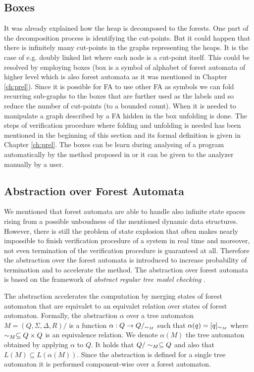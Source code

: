 \subsection{Boxes}
\label{subsec:boxes}

It was already explained how the heap is decomposed to the forests.
One part of the decomposition process is identifying the cut-points.
But it could happen that there is infinitely many cut-points in the graphs representing the heaps.
It is the case of e.g. doubly linked list where each node is a cut-point itself.
This could be resolved by employing boxes (box is a symbol of alphabet of forest automata of higher level which is also forest automata as it was mentioned in Chapter \ref{ch:prel}).
Since it is possible for FA to use other FA as symbols we can fold recurring sub-graphs to the boxes that are further used as the labels
and so reduce the number of cut-points (to a bounded count).
When it is needed to manipulate a graph described by a FA hidden in the box unfolding is done.
The steps of verification procedure where folding and unfolding is needed has been mentioned in the beginning of this section
and its formal definition is given in Chapter \ref{ch:prel}.
The boxes can be learn during analysing of a program automatically by the method proposed in \cite{forester13} or
it can be given to the analyzer manually by a user.

\subsection{Abstraction over Forest Automata}
\label{subsec:abstraction}

We mentioned that forest automata are able to handle also infinite state spaces
rising from a possible unboudness of the mentioned dynamic data structures.
However, there is still the problem of state explosion that often makes
nearly impossible to finish verification procedure of a system in real time
and moreover, not even termination of the verification procedure is guaranteed at all.
Therefore the abstraction over the forest automata is introduced to increase probability of termination
and to accelerate the method.
The abstraction over forest automata is based on the framework of \emph{abstract regular tree model checking} \cite{artmc}.

The abstraction accelerates the computation by merging states of forest automaton that are equivalet
to an equivalet relation over states of forest automaton.
Formally, the abstraction $\alpha$ over a tree automaton $M=(Q, \Sigma, \Delta, R)/$ is
a function $\alpha: Q \rightarrow Q/_{\sim_M}$ such that $\alpha(q) = [q]_{\sim_M}$
where $\sim_M \subseteq Q \times Q$ is an equivalence relation.
We denote $\alpha(M)$ the tree automaton obtained by applying $\alpha$ to $Q$.
It holds that $Q/\sim_M \subseteq Q$ and also that $L(M) \subseteq L(\alpha(M))$.
Since the abstraction is defined for a single tree automaton
it is performed component-wise over a forest automaton.


